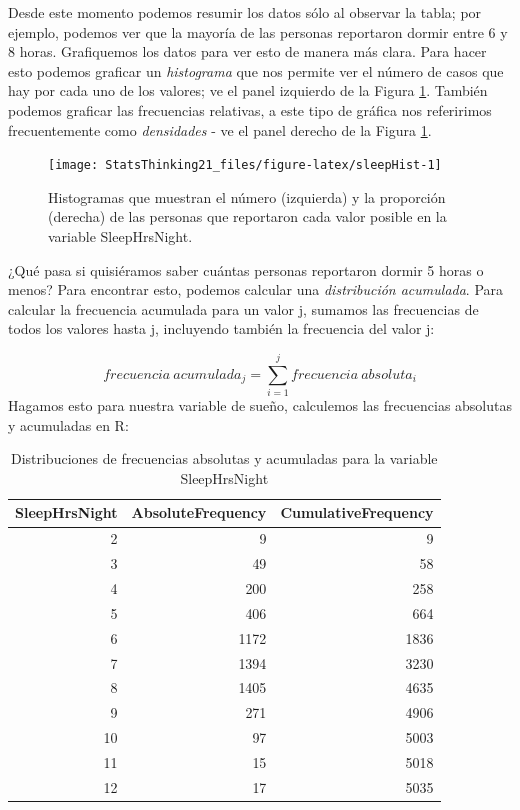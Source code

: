\documentclass[
  12pt,
]{book}
\theoremstyle{definition}
\theoremstyle{definition}
\theoremstyle{definition}
\theoremstyle{remark}
\begin{document}
Desde este momento podemos resumir los datos sólo al observar la tabla; por ejemplo, podemos ver que la mayoría de las personas reportaron dormir entre 6 y 8 horas. Grafiquemos los datos para ver esto de manera más clara. Para hacer esto podemos graficar un \emph{histograma} que nos permite ver el número de casos que hay por cada uno de los valores; ve el panel izquierdo de la Figura \ref{fig:sleepHist}. También podemos graficar las frecuencias relativas, a este tipo de gráfica nos referirimos frecuentemente como \emph{densidades} - ve el panel derecho de la Figura \ref{fig:sleepHist}.

\begin{figure}
\texttt{[image: StatsThinking21\_files/figure-latex/sleepHist-1]} \caption{Histogramas que muestran el número (izquierda) y la proporción (derecha) de las personas que reportaron cada valor posible en la variable SleepHrsNight.}\label{fig:sleepHist}
\end{figure}

¿Qué pasa si quisiéramos saber cuántas personas reportaron dormir 5 horas o menos? Para encontrar esto, podemos calcular una \emph{distribución acumulada}. Para calcular la frecuencia acumulada para un valor j, sumamos las frecuencias de todos los valores hasta j, incluyendo también la frecuencia del valor j:

\[
frecuencia\ acumulada_j = \sum_{i=1}^{j}{frecuencia\ absoluta_i}
\]
Hagamos esto para nuestra variable de sueño, calculemos las frecuencias absolutas y acumuladas en R:

\newpage

\begin{table}

\caption{\label{tab:unnamed-chunk-9}Distribuciones de frecuencias absolutas y acumuladas para la variable SleepHrsNight}
\centering
\begin{tabular}[t]{r|r|r}
\hline
SleepHrsNight & AbsoluteFrequency & CumulativeFrequency\\
\hline
2 & 9 & 9\\
\hline
3 & 49 & 58\\
\hline
4 & 200 & 258\\
\hline
5 & 406 & 664\\
\hline
6 & 1172 & 1836\\
\hline
7 & 1394 & 3230\\
\hline
8 & 1405 & 4635\\
\hline
9 & 271 & 4906\\
\hline
10 & 97 & 5003\\
\hline
11 & 15 & 5018\\
\hline
12 & 17 & 5035\\
\hline
\end{tabular}
\end{table}
\end{document}
